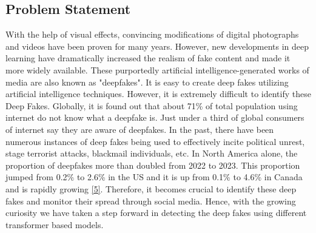 \subsection{Problem Statement}
With the help of visual effects, convincing modifications of digital photographs and videos have been proven for many years. However, new developments in deep learning have dramatically increased the realism of fake content and made it more widely available. These purportedly artificial intelligence-generated works of media are also known as "deepfakes". It is easy to create deep fakes utilizing artificial intelligence techniques. However, it is extremely difficult to identify these Deep Fakes.
Globally, it is found out that about 71\% of total population using internet do not know what a deepfake is. Just under a third of global consumers of internet say they are aware of deepfakes. In the past, there have been numerous instances of deep fakes being used to effectively incite political unrest, stage terrorist attacks, blackmail individuals, etc.
In North America alone, the proportion of deepfakes more than doubled from 2022 to 2023. This proportion jumped from 0.2\% to 2.6\% in the US and it is up from 0.1\% to 4.6\% in Canada and is rapidly growing \hyperref[ref5]{[5]}. Therefore, it becomes crucial to identify these deep fakes and monitor their spread through social media. Hence, with the growing curiosity we have taken a step forward in detecting the deep fakes using different transformer based models.